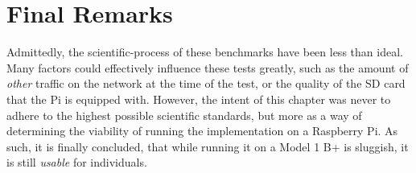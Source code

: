 	\section{Final Remarks}
		Admittedly, the scientific-process of these benchmarks have been less than ideal. Many factors could effectively influence these tests greatly, such as the amount of \emph{other} traffic on the network at the time of the test, or the quality of the SD card that the Pi is equipped with. However, the intent of this chapter was never to adhere to the highest possible scientific standards, but more as a way of determining the viability of running the implementation on a Raspberry Pi. As such, it is finally concluded, that while running it on a Model 1 B+ is sluggish, it is still \emph{usable} for individuals.